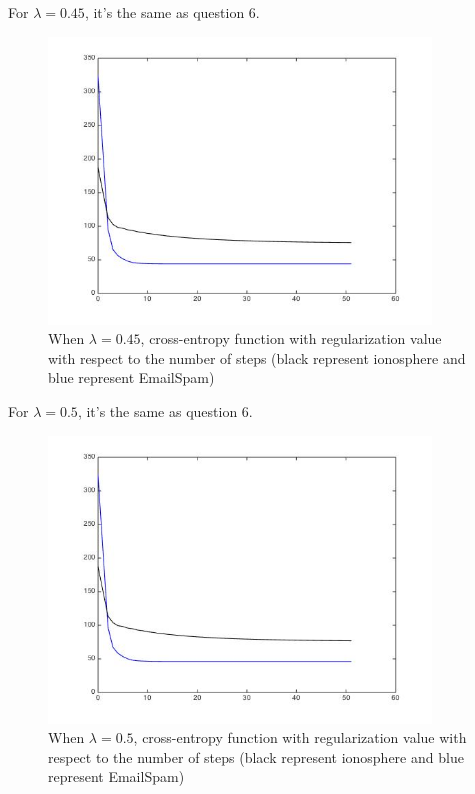\documentclass[11pt]{article}
\numberwithin{equation}{section}
\begin{document}
	For $\lambda = 0.45$, it's the same as question 6.
	\begin{figure} [H]
    	\centering 
    	\includegraphics[width=4in]{Q7045} 
    	\caption{When $\lambda = 0.45$, cross-entropy function with regularization value with respect to the number of steps (black represent ionosphere and blue represent EmailSpam)} 
    	\label{fig:side:a} 
	\end{figure}

	For $\lambda = 0.5$, it's the same as question 6.
	\begin{figure} [H]
    	\centering 
    	\includegraphics[width=4in]{Q705} 
    	\caption{When $\lambda = 0.5$, cross-entropy function with regularization value with respect to the number of steps (black represent ionosphere and blue represent EmailSpam)} 
    	\label{fig:side:a} 
	\end{figure}
\end{document}

